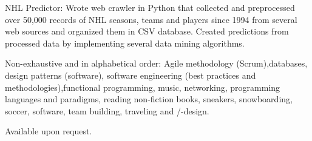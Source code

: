 \documentclass[10pt,a4paper]{article}
\begin{document}
\vspace{0.5em}
\inlineheadsection
  {NHL Predictor:}
  {Wrote web crawler in Python that collected and preprocessed over
50,000 records of NHL seasons, teams and players since 1994 from several web sources and organized them
in CSV database. Created predictions from processed data by implementing several data mining algorithms.}

\spacedhrule{1.6em}{-0.4em}


\inlineheadsection
  {Non-exhaustive and in alphabetical order:}
  {Agile methodology (Scrum),databases, design patterns (software), software engineering (best practices and methodologies),functional programming, music, networking, programming languages and paradigms, reading non-fiction books, sneakers, snowboarding, soccer, software, team building, traveling and /-design.}

\spacedhrule{1.6em}{-0.4em}



\inlineheadsection
  {Available upon request.}
\end{document}
